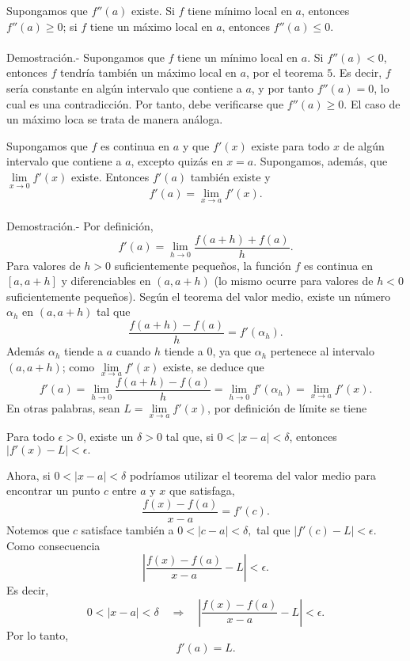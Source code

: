 \begin{teo}
    Supongamos que $f''(a)$ existe. Si $f$ tiene mínimo local en $a$, entonces $f''(a)\geq 0$; si $f$ tiene un máximo local en $a$, entonces $f''(a)\leq 0.$\\\\
	Demostración.-\; Supongamos que $f$ tiene un mínimo local en $a$. Si $f''(a)<0$, entonces $f$ tendría también un máximo local en $a$, por el teorema $5$. Es decir, $f$ sería constante en algún intervalo que contiene a $a$, y por tanto $f''(a)=0$, lo cual es una contradicción. Por tanto, debe verificarse que $f''(a)\geq 0$. El caso de un máximo loca se trata de manera análoga.\\
\end{teo}

\begin{teo}
    Supongamos que $f$ es continua en $a$ y que $f'(x)$ existe para todo $x$ de algún intervalo que contiene a $a$, excepto quizás en $x=a$. Supongamos, además, que $\lim\limits_{x\to 0}f'(x)$ existe. Entonces $f'(a)$ también existe y 
    $$f'(a)=\lim\limits_{x\to a}f'(x).$$\\
	Demostración.-\; Por definición,
	$$f'(a)=\lim\limits_{h\to 0}\dfrac{f(a+h)+f(a)}{h}.$$
	Para valores de $h>0$ suficientemente pequeños, la función $f$ es continua en $[a,a+h]$ y diferenciables en $(a,a+h)$ (lo mismo ocurre para valores de $h<0$ suficientemente pequeños). Según el teorema del valor medio, existe un número $\alpha_h$ en $(a,a+h)$ tal que 
	$$\dfrac{f(a+h)-f(a)}{h}=f'(\alpha_h).$$
	Además $\alpha_h$ tiende a $a$ cuando $h$ tiende a $0$, ya que $\alpha_h$ pertenece al intervalo $(a,a+h)$; como $\lim\limits_{x\to a}f'(x)$ existe, se deduce que 
	$$f'(a)=\lim_{h\to 0}\dfrac{f(a+h)-f(a)}{h}=\lim_{h\to 0}f'(\alpha_h)=\lim_{x\to a}f'(x).$$
	En otras palabras, sean $L=\lim\limits_{x\to a}f'(x)$, por definición de límite se tiene 
	\begin{center}
	    Para todo $\epsilon>0$, existe un $\delta>0$ tal que, si $0<|x-a|<\delta$, entonces $|f'(x)-L|<\epsilon.$
	\end{center}
	Ahora, si $0<|x-a|<\delta$ podríamos utilizar el teorema del valor medio para encontrar un punto $c$ entre $a$ y $x$ que satisfaga,
	$$\dfrac{f(x)-f(a)}{x-a}=f'(c).$$
	Notemos que $c$ satisface también a $0<|c-a|<\delta,$ tal que $|f'(c)-L|<\epsilon.$ Como consecuencia 
	$$\left|\dfrac{f(x)-f(a)}{x-a}-L\right|<\epsilon.$$ 
	Es decir,
	$$0<|x-a|<\delta \quad \Rightarrow \quad \left|\dfrac{f(x)-f(a)}{x-a}-L\right|<\epsilon.$$
	Por lo tanto, $$f'(a)=L.$$\\
\end{teo}

